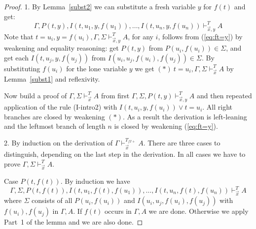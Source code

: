 \documentclass[10pt,a4paper]{article}
\begin{document}
\begin{proof}
1. By Lemma~\ref{subst2} we can substitute a fresh variable $y$ for $f(t)$ and get:
\begin{equation}\label{eq:ft=y}
\Gamma,P(t,y),  I(t,u_1,y,f(u_1)),\ldots,I(t,u_n,y,f(u_n))\vdash_{\vec{x},y}^{T} A
\end{equation}
Note that $t=u_i,y=f(u_i),\Gamma,\Sigma\vdash_{\vec{x},y}^{T} A$,
for any $i$, follows from (\ref{eq:ft=y}) by weakening and equality reasoning:
get $P(t,y)$ from $P(u_i,f(u_i))\in\Sigma$, and get each $I(t,u_j,y,f(u_j))$ 
from $I(u_i,u_j,f(u_i),f(u_j))\in\Sigma$. 
By substituting $f(u_i)$ for the
lone variable $y$ we get $(\ast)~t=u_i,\Gamma,\Sigma\vdash_{\vec{x}}^{T} A$
by Lemma~\ref{subst1} and reflexivity.

Now build a proof of $\Gamma,\Sigma\vdash_{\vec{x}}^{T} A$ from first 
$\Gamma,\Sigma,P(t,y)\vdash_{\vec{x},y}^{T} A$ and then repeated
application of the rule (I-intro2) with $I(t,u_i,y,f(u_i)) \lor t=u_i$. 
All right branches are closed by weakening  $(\ast)$. As a result the derivation
is left-leaning and the leftmost branch of length $n$ is closed by
weakening (\ref{eq:ft=y}).

2. By induction on the derivation of $\Gamma\vdash_{\vec{x}}^{T_{f\!I\!{+}}} A$.
There are three cases to distinguish, depending on the last step in the derivation.
In all cases we have to prove $\Gamma,\Sigma\vdash_{\vec{x}}^{T} A$.

Case $P(t,f(t))$. By induction we have 
\begin{equation}\label{ih:Ptft}
\Gamma,\Sigma,P(t,f(t)), I(t,u_1,f(t),f(u_1)),\ldots,I(t,u_n,f(t),f(u_n))\vdash_{\vec{x}}^{T} A
\end{equation}
where $\Sigma$ consists of all $P(u_i,f(u_i))$ and $I(u_i,u_j,f(u_i),f(u_j))$
with $f(u_i),f(u_j)$ in $\Gamma,A$. 
If $f(t)$ occurs in $\Gamma,A$ we are done.
Otherwise we apply Part~1 of the lemma and we are also done.


\end{proof}
\end{document}
